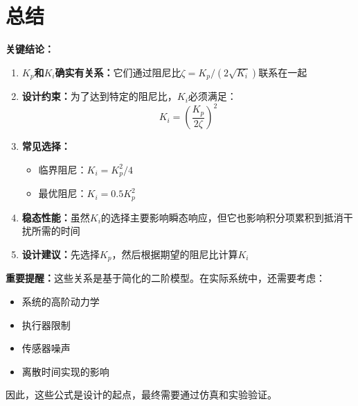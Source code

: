 \documentclass[12pt,a4paper]{article}
\begin{document}
\section{总结}

\textbf{关键结论：}

\begin{enumerate}
\item \textbf{$K_p$和$K_i$确实有关系：}它们通过阻尼比$\zeta = K_p/(2\sqrt{K_i})$联系在一起

\item \textbf{设计约束：}为了达到特定的阻尼比，$K_i$必须满足：
   \begin{equation}
   K_i = \left(\frac{K_p}{2\zeta}\right)^2
   \end{equation}

\item \textbf{常见选择：}
   \begin{itemize}
   \item 临界阻尼：$K_i = K_p^2/4$
   \item 最优阻尼：$K_i = 0.5 K_p^2$
   \end{itemize}

\item \textbf{稳态性能：}虽然$K_i$的选择主要影响瞬态响应，但它也影响积分项累积到抵消干扰所需的时间

\item \textbf{设计建议：}先选择$K_p$，然后根据期望的阻尼比计算$K_i$
\end{enumerate}

\textbf{重要提醒：}这些关系是基于简化的二阶模型。在实际系统中，还需要考虑：
\begin{itemize}
\item 系统的高阶动力学
\item 执行器限制
\item 传感器噪声
\item 离散时间实现的影响
\end{itemize}

因此，这些公式是设计的起点，最终需要通过仿真和实验验证。
\end{document}
